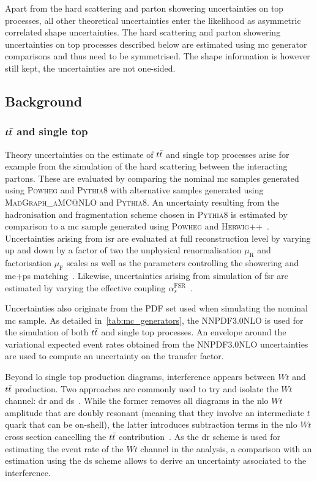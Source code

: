  Apart from the hard scattering and parton showering uncertainties on top processes, all other theoretical uncertainties enter the likelihood as asymmetric correlated shape uncertainties. The hard scattering and parton showering uncertainties on top processes described below are estimated using \gls{mc} generator comparisons and thus need to be symmetrised. The shape information is however still kept, \ie the uncertainties are not one-sided.
 
 \subsection{Background}
 
 \subsubsection{$\boldsymbol{t\bar{t}}$ and single top}
 
 Theory uncertainties on the estimate of $t\bar{t}$ and single top processes arise for example from the simulation of the hard scattering between the interacting partons. These are evaluated by comparing the nominal \gls{mc} samples generated using \textsc{Powheg} and \textsc{Pythia8} with alternative samples generated using \textsc{MadGraph\_aMC@NLO} and \textsc{Pythia8}. An uncertainty resulting from the hadronisation and fragmentation scheme chosen in \textsc{Pythia8} is estimated by comparison to a \gls{mc} sample generated using \textsc{Powheg} and \textsc{Herwig++}~\cite{Herwig:2015jjp}. Uncertainties arising from \gls{isr} are evaluated at full reconstruction level by varying up and down by a factor of two the unphysical renormalisation $\mu_\mathrm{R}$ and factorisation $\mu_\mathrm{F}$ scales as well as the parameters controlling the showering and \gls{me}+\gls{ps} matching~\cite{ATL-PHYS-PUB-2016-004}. Likewise, uncertainties arising from simulation of \gls{fsr} are estimated by varying the effective coupling $\alpha_s^{\mathrm{FSR}}$~\cite{ATL-PHYS-PUB-2016-004}. 
 
 Uncertainties also originate from the \gls{PDF} set used when simulating the nominal \gls{mc} sample. As detailed in~\cref{tab:mc_generators}, the \textsc{NNPDF3.0NLO} is used for the simulation of both $t\bar{t}$ and single top processes. An envelope around the variational expected event rates obtained from the \textsc{NNPDF3.0NLO} uncertainties are used to compute an uncertainty on the transfer factor.
 
 Beyond \gls{lo} single top production diagrams, interference appears between $Wt$ and $t\bar{t}$ production. Two approaches are commonly used to try and isolate the $Wt$ channel: \gls{dr} and \gls{ds}~\cite{Frixione:2008yi}. While the former removes all diagrams in the \gls{nlo} $Wt$ amplitude that are doubly resonant (meaning that they involve an intermediate $t$ quark that can be on-shell), the latter introduces subtraction terms in the \gls{nlo} $Wt$ cross section cancelling the $t\bar{t}$ contribution~\cite{Frixione:2008yi}. As the \gls{dr} scheme is used for estimating the event rate of the $Wt$ channel in the analysis, a comparison with an estimation using the \gls{ds} scheme allows to derive an uncertainty associated to the interference.
  
